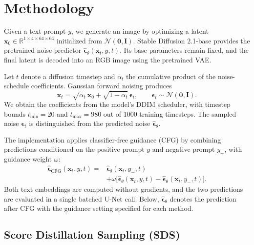 \section{Methodology}
\label{sec:method}

Given a text prompt $y$, we generate an image by optimizing a latent
$\mathbf{x}_0\in\mathbb{R}^{1\times4\times64\times64}$ initialized from
$\mathcal{N}(\mathbf{0},\mathbf{I})$.
Stable Diffusion 2.1-base provides the pretrained noise predictor
$\hat{\boldsymbol{\epsilon}}_\theta(\mathbf{x}_t,y,t)$.
Its base parameters remain fixed, and the final latent is decoded into an RGB image using the
pretrained VAE.

Let $t$ denote a diffusion timestep and $\bar\alpha_t$ the cumulative product of the noise-schedule
coefficients.
Gaussian forward noising produces
\begin{equation}
 \mathbf{x}_t=\sqrt{\bar\alpha_t}\,\mathbf{x}_0
   +\sqrt{1-\bar\alpha_t}\,\boldsymbol{\epsilon}_t,
 \qquad \boldsymbol{\epsilon}_t\sim\mathcal{N}(\mathbf{0},\mathbf{I}).
 \label{eq:forward}
\end{equation}
We obtain the coefficients from the model's DDIM scheduler, with timestep bounds $t_{\min}=20$ and
$t_{\max}=980$ out of 1000 training timesteps.
The sampled noise $\boldsymbol{\epsilon}_t$ is distinguished from the predicted noise
$\hat{\boldsymbol{\epsilon}}_\theta$.

The implementation applies classifier-free guidance (CFG) by combining predictions conditioned on
the positive prompt $y$ and negative prompt $y_-$, with guidance weight $\omega$:
\begin{equation}
\begin{aligned}
 \hat{\boldsymbol{\epsilon}}_{\mathrm{CFG}}(\mathbf{x}_t,y,t)
 ={}&\hat{\boldsymbol{\epsilon}}_\theta(\mathbf{x}_t,y_-,t)\\
 &+\omega\bigl[\hat{\boldsymbol{\epsilon}}_\theta(\mathbf{x}_t,y,t)
 -\hat{\boldsymbol{\epsilon}}_\theta(\mathbf{x}_t,y_-,t)\bigr].
\end{aligned}
 \label{eq:cfg}
\end{equation}
Both text embeddings are computed without gradients, and the two predictions are evaluated in a
single batched U-Net call.
Below, $\hat{\boldsymbol{\epsilon}}_\theta$ denotes the prediction after CFG with the guidance
setting specified for each method.

\subsection{Score Distillation Sampling (SDS)}
\label{sec:sds}

